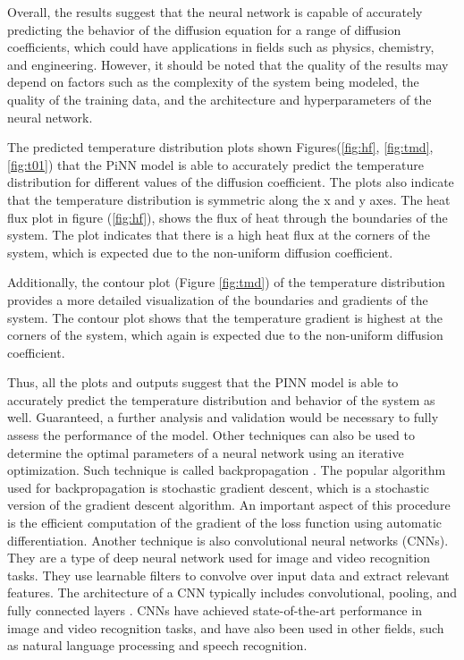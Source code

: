 Overall, the results suggest that the neural network is capable of accurately predicting the behavior of the diffusion equation for a range of diffusion coefficients, which could have applications in fields such as physics, chemistry, and engineering. However, it should be noted that the quality of the results may depend on factors such as the complexity of the system being modeled, the quality of the training data, and the architecture and hyperparameters of the neural network.

The predicted temperature distribution plots shown Figures(\ref{fig:hf}, \ref{fig:tmd}, \ref{fig:t01}) that the PiNN model is able to accurately predict the temperature distribution for different values of the diffusion coefficient. The plots also indicate that the temperature distribution is symmetric along the x and y axes. The heat flux plot in figure (\ref{fig:hf}), shows the flux of heat through the boundaries of the system. The plot indicates that there is a high heat flux at the corners of the system, which is expected due to the non-uniform diffusion coefficient.

Additionally, the contour plot (Figure \ref{fig:tmd}) of the temperature distribution provides a more detailed visualization of the boundaries and gradients of the system. The contour plot shows that the temperature gradient is highest at the corners of the system, which again is expected due to the non-uniform diffusion coefficient.

Thus, all the plots and outputs suggest that the PINN model is able to accurately predict the temperature distribution and behavior of the system as well. Guaranteed, a further analysis and validation would be necessary to fully assess the performance of the model. Other techniques can also be used to determine the optimal parameters of a neural network using an iterative optimization. Such technique is called backpropagation \cite{Sukumar2022}. The popular algorithm used for backpropagation is stochastic gradient descent, which is a stochastic version of the gradient descent algorithm. An important aspect of this procedure is the efficient computation of the gradient of the loss function using automatic differentiation. Another technique is also convolutional neural networks (CNNs). They are a type of deep neural network used for image and video recognition tasks. They use learnable filters to convolve over input data and extract relevant features. The architecture of a CNN typically includes convolutional, pooling, and fully connected layers \cite{Srivastava2018}. CNNs have achieved state-of-the-art performance in image and video recognition tasks, and have also been used in other fields, such as natural language processing and speech recognition.

